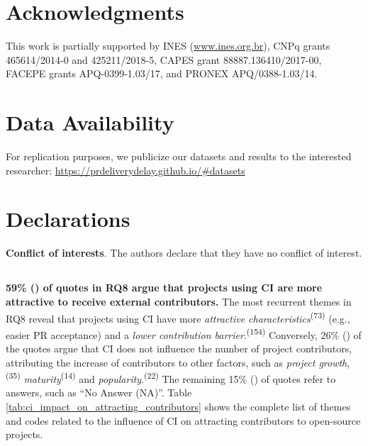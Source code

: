 \section*{Acknowledgments}
\label{sec_Acknowledgments}

This work is partially supported by INES (\url{www.ines.org.br}), CNPq grants 465614/2014-0 and 425211/2018-5, CAPES grant 88887.136410/2017-00, FACEPE grants APQ-0399-1.03/17, and PRONEX APQ/0388-1.03/14.

\section*{Data Availability}
For replication purposes, we publicize our datasets and results to the interested researcher: \url{https://prdeliverydelay.github.io/#datasets}

\section*{Declarations}

\textbf{Conflict of interests}. The authors declare that they have no conflict of interest.
\subsection*{\textbf{\RQeight}}
	
	\noindent\textbf{59\% () of quotes in RQ8 argue that projects using CI are more attractive to receive external contributors.} The most recurrent themes in RQ8 reveal that projects using CI have more  \textit{attractive characteristics}\textsuperscript{(73)} (e.g., easier PR acceptance) and a \textit{lower contribution barrier}.\textsuperscript{(154)}
	Conversely, 26\% () of the quotes argue that CI does not influence the number of project contributors, attributing the increase of contributors to other factors, such as \textit{project growth},\textsuperscript{(35)} \textit{maturity}\textsuperscript{(14)} and \textit{popularity}.\textsuperscript{(22)} The remaining 15\% () of quotes refer to answers, such as ``No Answer (NA)''. Table \ref{tab:ci_impact_on_attracting_contributors} shows the complete list of themes and codes related to the influence of CI on attracting contributors to open-source projects.
	
